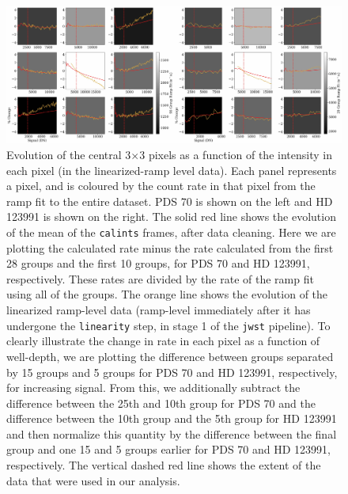 \documentclass[11pt,twocolumn,twocolappendix]{aastex631}
\begin{document}
\begin{figure}
\includegraphics[width=\linewidth]{f480M_pix_ev_final_rev2.pdf}
\caption{Evolution of the central 3$\times$3 pixels as a function of the intensity in each pixel (in the linearized-ramp level data). {Each panel represents a pixel, and is coloured by the count rate in that pixel from the ramp fit to the entire dataset}. PDS 70 is shown on the left and HD 123991 is shown on the right. The solid red line shows the evolution of the mean of the \texttt{calints} frames, after data cleaning. Here we are plotting the calculated rate minus the rate calculated from the first 28 groups and the first 10 groups, for PDS 70 and HD 123991, respectively. These rates are divided by the rate of the ramp fit using all of the groups. The {orange} line shows the evolution of the linearized ramp-level data (ramp-level immediately after it has undergone the \texttt{linearity} step, in stage 1 of the \texttt{jwst} pipeline). To clearly illustrate the change in rate in each pixel as a function of well-depth, we are plotting the difference between groups separated by 15 groups and 5 groups for PDS 70 and HD 123991, respectively, for increasing signal. From this, we additionally subtract the difference between the 25th and 10th group for PDS 70 and the difference between the 10th group and the 5th group for HD 123991 and then normalize this quantity by the difference between the final group and one 15 and 5 groups earlier for PDS 70 and HD 123991, respectively. The vertical dashed red line shows the extent of the data that were used in our analysis.}
\label{fig:pix_ev}
\end{figure}



\end{document}
